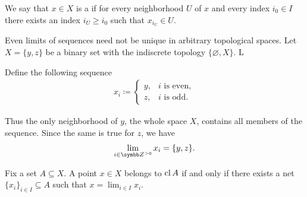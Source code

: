 \begin{definition}\label{def:net_cluster_point}\cite[50]{Engelking1989}
  We say that \( x \in X \) is a  if for every neighborhood \( U \) of \( x \) and every index \( i_0 \in I \) there exists an index \( i_U \geq i_0 \) such that \( x_{i_U} \in U \).
\end{definition}

\begin{example}\label{ex:multiple_limit_points_of_net}
  Even limits of sequences need not be unique in arbitrary topological spaces. Let \( X = \{ y, z \} \) be a binary set with the indiscrete topology \( \{ \varnothing, X \} \). L

  Define the following sequence
  \begin{align*}
    x_i \coloneqq \begin{cases}
      y, &i \text{ is even}, \\
      z, &i \text{ is odd}.
    \end{cases}
  \end{align*}

  Thus the only neighborhood of \( y \), the whole space \( X \), contains all members of the sequence. Since the same is true for \( z \), we have
  \begin{align*}
    \lim_{i \in \BB{Z}^{>0}} x_i = \{ y, z \}.
  \end{align*}
\end{example}

\begin{proposition}\label{thm:limit_point_iff_in_closure}\cite[proposition 1.6.3]{Engelking1989}
  Fix a set \( A \subseteq X \). A point \( x \in X \) belongs to \( \operatorname{cl}{A} \) if and only if there exists a net \( \{ x_i \}_{i \in I} \subseteq A \) such that \( x = \lim_{i \in I} x_i \).
\end{proposition}
